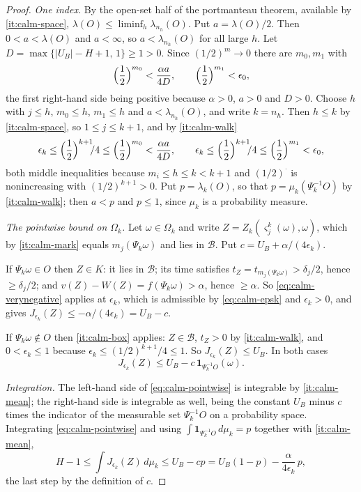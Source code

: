 \begin{proof}
\emph{One index.} By the open-set half of the portmanteau theorem, available
by \ref{it:calm-space},
$\lambda(O)\le\liminf_h\lambda_{n_h}(O)$. Put $a=\lambda(O)/2$. Then
$0<a<\lambda(O)$ and $a<\infty$, so $a<\lambda_{n_h}(O)$ for all large $h$.
Let $D=\max\{|U_B|-H+1,\,1\}\ge1>0$. Since $(1/2)^m\to0$ there are $m_0,m_1$
with
\[
  \Bigl(\frac12\Bigr)^{m_0}<\frac{\alpha a}{4D},
  \qquad
  \Bigl(\frac12\Bigr)^{m_1}<\epsilon_0 ,
\]
the first right-hand side being positive because $\alpha>0$, $a>0$ and $D>0$.
Choose $h$ with $j\le h$, $m_0\le h$, $m_1\le h$ and $a<\lambda_{n_h}(O)$, and
write $k=n_h$. Then $h\le k$ by \ref{it:calm-space}, so $1\le j\le k+1$, and
by \ref{it:calm-walk}
\begin{equation}\label{eq:calm-epsk}
  \epsilon_k\le\Bigl(\frac12\Bigr)^{k+1}\!\!/4
   \le\Bigl(\frac12\Bigr)^{m_0}<\frac{\alpha a}{4D},
  \qquad
  \epsilon_k\le\Bigl(\frac12\Bigr)^{k+1}\!\!/4
   \le\Bigl(\frac12\Bigr)^{m_1}<\epsilon_0 ,
\end{equation}
both middle inequalities because $m_i\le h\le k<k+1$ and $(1/2)^\cdot$ is
nonincreasing with $(1/2)^{k+1}>0$. Put $p=\lambda_k(O)$, so that
$p=\mu_k(\Psi_k^{-1}O)$ by \ref{it:calm-walk}; then $a<p$ and $p\le1$, since
$\mu_k$ is a probability measure.

\emph{The pointwise bound on $\Omega_k$.} Let $\omega\in\Omega_k$ and write
$Z=Z_k(\varsigma^k_j(\omega),\omega)$, which by \ref{it:calm-mark} equals
$m_j(\Psi_k\omega)$ and lies in $\mathcal B$. Put
$c=U_B+\alpha/(4\epsilon_k)$.

If $\Psi_k\omega\in O$ then $Z\in K$: it lies in $\mathcal B$; its time
satisfies $t_Z=t_{m_j(\Psi_k\omega)}>\delta_j/2$, hence $\ge\delta_j/2$; and
$v(Z)-W(Z)=f(\Psi_k\omega)>\alpha$, hence $\ge\alpha$. So
\eqref{eq:calm-verynegative} applies at $\epsilon_k$, which is admissible by
\eqref{eq:calm-epsk} and $\epsilon_k>0$, and gives
$J_{\epsilon_k}(Z)\le-\alpha/(4\epsilon_k)=U_B-c$.

If $\Psi_k\omega\notin O$ then \ref{it:calm-box} applies: $Z\in\mathcal B$,
$t_Z>0$ by \ref{it:calm-walk}, and $0<\epsilon_k\le1$ because
$\epsilon_k\le(1/2)^{k+1}/4\le1$. So $J_{\epsilon_k}(Z)\le U_B$. In both cases
\begin{equation}\label{eq:calm-pointwise}
  J_{\epsilon_k}(Z)\le U_B-c\,\mathbf1_{\Psi_k^{-1}O}(\omega).
\end{equation}

\emph{Integration.} The left-hand side of \eqref{eq:calm-pointwise} is
integrable by \ref{it:calm-mean}; the right-hand side is integrable as well,
being the constant $U_B$ minus $c$ times the indicator of the measurable set
$\Psi_k^{-1}O$ on a probability space. Integrating \eqref{eq:calm-pointwise}
and using $\int\mathbf1_{\Psi_k^{-1}O}\,d\mu_k=p$ together with
\ref{it:calm-mean},
\[
  H-1\le\int J_{\epsilon_k}(Z)\,d\mu_k
   \le U_B-cp
   =U_B(1-p)-\frac{\alpha}{4\epsilon_k}\,p ,
\]
the last step by the definition of $c$.


\end{proof}
